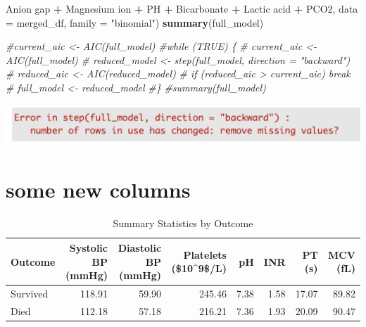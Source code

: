 \documentclass[
]{article}
\newenvironment{Shaded}{\begin{snugshade}}{\end{snugshade}}
\newcommand{\AttributeTok}[1]{\textcolor[rgb]{0.13,0.29,0.53}{#1}}
\newcommand{\CommentTok}[1]{\textcolor[rgb]{0.56,0.35,0.01}{\textit{#1}}}
\newcommand{\FunctionTok}[1]{\textcolor[rgb]{0.13,0.29,0.53}{\textbf{#1}}}
\newcommand{\NormalTok}[1]{#1}
\newcommand{\SpecialCharTok}[1]{\textcolor[rgb]{0.81,0.36,0.00}{\textbf{#1}}}
\newcommand{\StringTok}[1]{\textcolor[rgb]{0.31,0.60,0.02}{#1}}
\begin{document}
\begin{Shaded}
\begin{Highlighting}[]
            \StringTok{\textasciigrave{}}\AttributeTok{Anion gap}\StringTok{\textasciigrave{}} \SpecialCharTok{+} \StringTok{\textasciigrave{}}\AttributeTok{Magnesium ion}\StringTok{\textasciigrave{}} \SpecialCharTok{+}\NormalTok{ PH }\SpecialCharTok{+}\NormalTok{ Bicarbonate }\SpecialCharTok{+} \StringTok{\textasciigrave{}}\AttributeTok{Lactic acid}\StringTok{\textasciigrave{}} \SpecialCharTok{+}\NormalTok{ PCO2, }
            \AttributeTok{data =}\NormalTok{ merged\_df, }\AttributeTok{family =} \StringTok{"binomial"}\NormalTok{)}
\FunctionTok{summary}\NormalTok{(full\_model)}
\end{Highlighting}
\end{Shaded}

\begin{Shaded}
\begin{Highlighting}[]
\CommentTok{\#current\_aic \textless{}{-} AIC(full\_model)}
\CommentTok{\#while (TRUE) \{}
\CommentTok{\#    current\_aic \textless{}{-} AIC(full\_model)}
\CommentTok{\#    reduced\_model \textless{}{-} step(full\_model, direction = "backward")}
\CommentTok{\#    reduced\_aic \textless{}{-} AIC(reduced\_model)}
\CommentTok{\#    if (reduced\_aic \textgreater{} current\_aic) break}
\CommentTok{\#    full\_model \textless{}{-} reduced\_model}
\CommentTok{\#\}}
\CommentTok{\#summary(full\_model)}
\end{Highlighting}
\end{Shaded}

\includegraphics{error1.png}

\hypertarget{some-new-columns}{%
\section{some new columns}\label{some-new-columns}}

\begin{table}

\caption{\label{tab:unnamed-chunk-9}Summary Statistics by Outcome}
\centering
\begin{tabular}[t]{l|r|r|r|r|r|r|r}
\hline
Outcome & Systolic BP (mmHg) & Diastolic BP (mmHg) & Platelets (\$10\textasciicircum{}9\$/L) & pH & INR & PT (s) & MCV (fL)\\
\hline
Survived & 118.91 & 59.90 & 245.46 & 7.38 & 1.58 & 17.07 & 89.82\\
\hline
Died & 112.18 & 57.18 & 216.21 & 7.36 & 1.93 & 20.09 & 90.47\\
\hline
\end{tabular}
\end{table}
\end{document}
